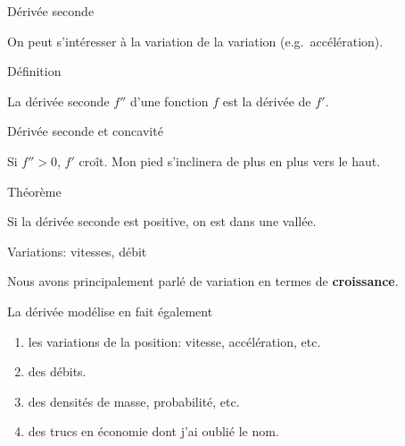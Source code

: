 \documentclass{beamer}
\begin{document}
\begin{frame}
    {Dérivée seconde}

    On peut s'intéresser à la variation de la variation (e.g.\ accélération).
    \begin{exampleblock}
        {Définition}

        La dérivée seconde $f''$ d'une fonction $f$ est la dérivée de $f'$.
    \end{exampleblock}
\end{frame}

\begin{frame}
    {Dérivée seconde et concavité}

    Si $f'' > 0$, $f'$ croît.
    Mon pied s'inclinera de plus en plus vers le haut.

    \begin{exampleblock}
        {Théorème}

        Si la dérivée seconde est positive,
        on est dans une vallée.
    \end{exampleblock}

    \begin{plot}{0.25}{-10}{-2}{10}{10}
    \end{plot}
\end{frame}

\begin{frame}
    {Variations: vitesses, débit}

    Nous avons principalement parlé de variation en termes de \textbf{croissance}.

    La dérivée modélise en fait également
    \begin{enumerate}
        \item les variations de la position: vitesse, accélération, etc.
            \pause{}
        \item des débits.
            \pause{}
        \item des densités de masse, probabilité, etc.
            \pause{}
        \item des trucs en économie dont j'ai oublié le nom.
    \end{enumerate}
\end{frame}
\end{document}

